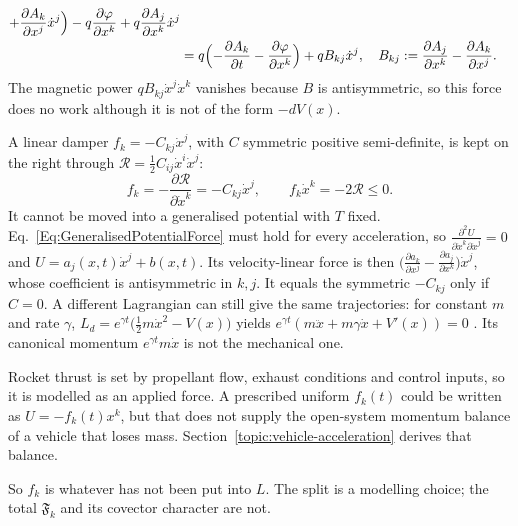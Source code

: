 \begin{description}
\begin{equation}
\begin{aligned}
          +\frac{\partial A_k}{\partial x^j}\dot x^j\Bigr)
      -q\frac{\partial\varphi}{\partial x^k}
      +q\frac{\partial A_j}{\partial x^k}\dot x^j\\
    &=q\Bigl(-\frac{\partial A_k}{\partial t}
             -\frac{\partial\varphi}{\partial x^k}\Bigr)
      +qB_{kj}\dot x^j,
    \quad
    B_{kj}:=\frac{\partial A_j}{\partial x^k}-\frac{\partial A_k}{\partial x^j}.
  \end{aligned}
  \end{equation}
  The magnetic power $qB_{kj}\dot x^j\dot x^k$ vanishes because $B$ is
  antisymmetric, so this force does no work although it is not of the form
  $-dV(x)$.
\item[Rayleigh dissipation.] A linear damper $f_k=-C_{kj}\dot x^j$, with
  $C$ symmetric positive semi-definite, is kept on the right through
  $\mathcal R=\tfrac12C_{ij}\dot x^i\dot x^j$:
  \begin{equation}\label{Eq:RayleighForceAndPower}
   f_k=-\frac{\partial\mathcal R}{\partial\dot x^k}=-C_{kj}\dot x^j,
   \qquad
   f_k\dot x^k=-2\mathcal R\le0 .
  \end{equation}
  It cannot be moved into a generalised potential with $T$ fixed.
  Eq.~\ref{Eq:GeneralisedPotentialForce} must hold for every acceleration,
  so $\frac{\partial^2U}{\partial\dot x^k\partial\dot x^j}=0$ and
  $U=a_j(x,t)\dot x^j+b(x,t)$. Its velocity-linear force is then
  $\bigl(\frac{\partial a_k}{\partial x^j}-\frac{\partial a_j}{\partial x^k}
  \bigr)\dot x^j$, whose coefficient is antisymmetric in $k,j$. It equals the
  symmetric $-C_{kj}$ only if $C=0$. A different Lagrangian can still give
  the same trajectories: for constant $m$ and rate $\gamma$,
  $L_d=e^{\gamma t}\bigl(\tfrac12m\dot x^2-V(x)\bigr)$ yields
  $e^{\gamma t}(m\ddot x+m\gamma\dot x+V'(x))=0$ \cite{leonegourieux}. Its
  canonical momentum $e^{\gamma t}m\dot x$ is not the mechanical one.
\item[Thrust stays on the right.] Rocket thrust is set by propellant flow,
  exhaust conditions and control inputs, so it is modelled as an applied
  force. A prescribed uniform $f_k(t)$ could be written as
  $U=-f_k(t)x^k$, but that does not supply the open-system momentum balance
  of a vehicle that loses mass. Section~\ref{topic:vehicle-acceleration}
  derives that balance.
\end{description}

\noindent So $f_k$ is whatever has not been put into $L$. The split is a
modelling choice; the total $\mathfrak F_k$ and its covector character are
not.

